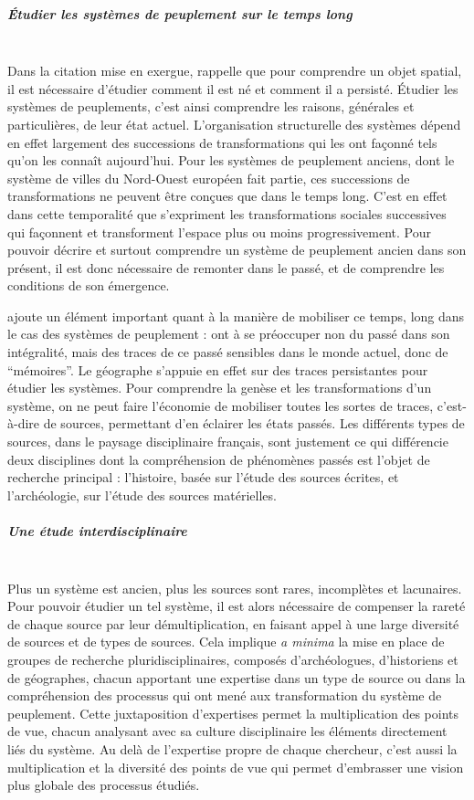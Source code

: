 \subparagraph{Étudier les systèmes de peuplement sur le temps long}~\\
Dans la citation mise en exergue, \textcite{durand-dastes_jamais_1999} rappelle que pour comprendre un \og objet spatial\fg{}, il est nécessaire d'étudier \og comment il est né et comment il a persisté\fg{}.
Étudier les systèmes de peuplements, c'est ainsi comprendre les raisons, générales et particulières, de leur état actuel.
L'organisation structurelle des systèmes dépend en effet largement des successions de transformations qui les ont façonné tels qu'on les connaît aujourd'hui.
Pour les systèmes de peuplement anciens, dont le système de villes du Nord-Ouest européen fait partie, ces successions de transformations ne peuvent être conçues que dans le temps long.
C'est en effet dans cette temporalité que s'expriment les transformations sociales successives qui façonnent et transforment l'espace plus ou moins progressivement.
Pour pouvoir décrire et surtout comprendre un système de peuplement ancien dans son présent, il est donc nécessaire de remonter dans le passé, et de comprendre les conditions de son émergence.


\textcite{durand-dastes_jamais_1999} ajoute un élément important quant à la manière de mobiliser ce temps, long dans le cas des systèmes de peuplement :
 ont à se préoccuper non du passé dans son intégralité, mais des traces de ce passé sensibles dans le monde actuel, donc de ``mémoires''\fg{}.
Le géographe s'appuie en effet sur des \og traces\fg{} persistantes pour étudier les systèmes.
Pour comprendre la genèse et les transformations d'un système, on ne peut faire l'économie de mobiliser toutes les sortes de traces, c'est-à-dire de sources, permettant d'en éclairer les états passés.
Les différents types de sources, dans le paysage disciplinaire français, sont justement ce qui différencie deux disciplines dont la compréhension de phénomènes passés est l'objet de recherche principal : l'histoire, basée sur l'étude des sources écrites, et l'archéologie, sur l'étude des sources matérielles.

\subparagraph{Une étude interdisciplinaire}~\\
Plus un système est ancien, plus les sources sont rares, incomplètes et lacunaires.
Pour pouvoir étudier un tel système, il est alors nécessaire de compenser la rareté de chaque source par leur démultiplication, en faisant appel à une large diversité de sources et de types de sources.
Cela implique \textit{a minima} la mise en place de groupes de recherche pluridisciplinaires, composés d'archéologues, d'historiens et de géographes, chacun apportant une expertise dans un type de source ou dans la compréhension des processus qui ont mené aux transformation du système de peuplement.
Cette juxtaposition d'expertises permet la multiplication des points de vue, chacun analysant avec sa culture disciplinaire les éléments directement liés du système.
Au delà de l'expertise propre de chaque chercheur, c'est aussi la multiplication et la diversité des points de vue qui permet d'embrasser une vision plus globale des processus étudiés.

